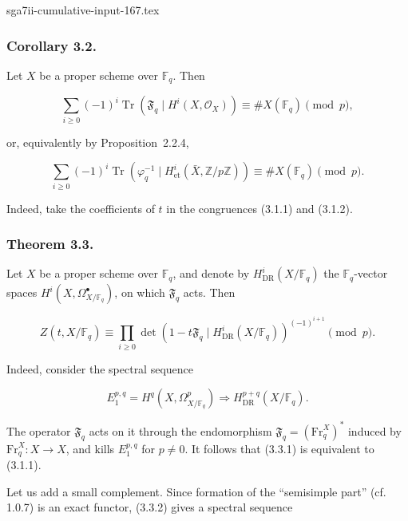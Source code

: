 \begin{filecontents*}{sga7ii-cumulative-input-167.tex}
\subsubsection*{Corollary 3.2.}
Let $X$ be a proper scheme over $\mathbb F_q$. Then

\begin{equation}\tag{3.2.1}
\sum_{i\geq0}(-1)^i
\operatorname{Tr}\!\left(\mathfrak F_q\mid H^i(X,\mathcal O_X)\right)
\equiv \#X(\mathbb F_q)\pmod p,
\end{equation}

or, equivalently by Proposition~2.2.4,

\begin{equation}\tag{3.2.2}
\sum_{i\geq0}(-1)^i
\operatorname{Tr}\!\left(\varphi_q^{-1}\mid
H^i_{\mathrm{et}}(\bar X,\mathbb Z/p\mathbb Z)\right)
\equiv \#X(\mathbb F_q)\pmod p.
\end{equation}

Indeed, take the coefficients of $t$ in the congruences (3.1.1) and (3.1.2).

\subsubsection*{Theorem 3.3.}
Let $X$ be a proper scheme over $\mathbb F_q$, and denote by
$H^i_{\mathrm{DR}}(X/\mathbb F_q)$ the $\mathbb F_q$-vector spaces
$H^i(X,\Omega^\bullet_{X/\mathbb F_q})$, on which $\mathfrak F_q$ acts. Then

\begin{equation}\tag{3.3.1}
Z(t,X/\mathbb F_q)
\equiv
\prod_{i\geq0}
\det\!\left(1-t\mathfrak F_q\mid
H^i_{\mathrm{DR}}(X/\mathbb F_q)\right)^{(-1)^{i+1}}
\pmod p.
\end{equation}

Indeed, consider the spectral sequence

\begin{equation}\tag{3.3.2}
E_1^{p,q}=H^q(X,\Omega^p_{X/\mathbb F_q})
\Longrightarrow H^{p+q}_{\mathrm{DR}}(X/\mathbb F_q).
\end{equation}

The operator $\mathfrak F_q$ acts on it through the endomorphism
$\mathfrak F_q=(\mathrm{Fr}_q^X)^*$ induced by
$\mathrm{Fr}_q^X:X\longrightarrow X$, and kills $E_1^{p,q}$ for $p\ne0$.
It follows that (3.3.1) is equivalent to (3.1.1).

Let us add a small complement. Since formation of the ``semisimple part''
(cf. 1.0.7) is an exact functor, (3.3.2) gives a spectral sequence


\end{filecontents*}
